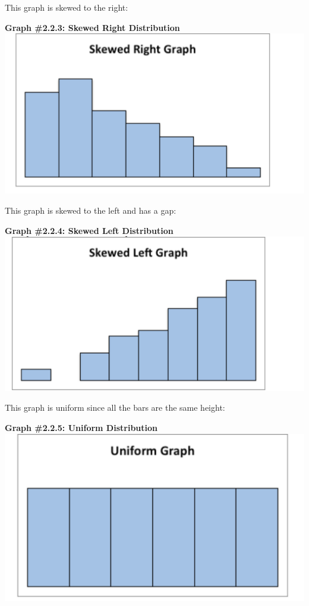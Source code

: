 \documentclass[]{book}
\begin{document}
This graph is skewed to the right:

\textbf{Graph \#2.2.3: Skewed Right Distribution}
\includegraphics{skewed_right.png}

This graph is skewed to the left and has a gap:

\textbf{Graph \#2.2.4: Skewed Left Distribution}
\includegraphics{skewed_left.png}

This graph is uniform since all the bars are the same height:

\textbf{Graph \#2.2.5: Uniform Distribution}
\includegraphics{uniform.png}
\end{document}
